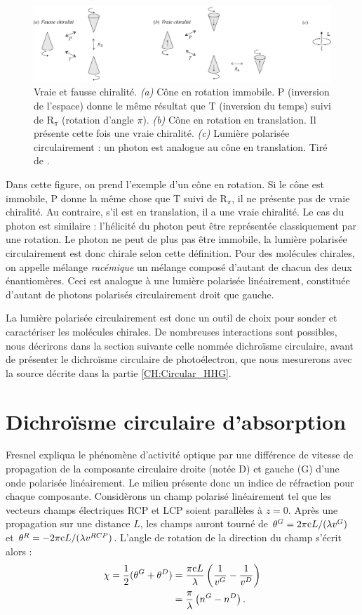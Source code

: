 \begin{figure}[!ht]
\centering
\includegraphics[width=.9\columnwidth]{Figures/Chirality/truefalsechir.pdf}%
\caption{Vraie et fausse chiralité. \textit{(a)} Cône en rotation immobile. P (inversion de l'espace) donne le même résultat que T (inversion du temps) suivi de $\text{R}_{\pi}$ (rotation d'angle $\pi$). \textit{(b)} Cône en rotation en translation. Il présente cette fois une vraie chiralité. \textit{(c)} Lumière polarisée circulairement : un photon est analogue au cône en translation. Tiré de .}
\label{fig:truefalsechir}
\end{figure}

Dans cette figure, on prend l'exemple d'un cône en rotation. Si le cône est immobile, P donne la même chose que T suivi de $\text{R}_{\pi}$, il ne présente pas de vraie chiralité. Au contraire, s'il est en translation, il a une vraie chiralité. Le cas du photon est similaire : l'hélicité du photon peut être représentée classiquement par une rotation. Le photon ne peut de plus pas être immobile, la lumière polarisée circulairement est donc chirale selon cette définition. Pour des molécules chirales, on appelle mélange \textit{racémique} un mélange composé d'autant de chacun des deux énantiomères. Ceci est analogue à une lumière polarisée linéairement, constituée d'autant de photons polarisés circulairement droit que gauche. 

La lumière polarisée circulairement est donc un outil de choix pour sonder et caractériser les molécules chirales. De nombreuses interactions sont possibles, nous décrirons dans la section suivante celle nommée dichroïsme circulaire, avant de présenter le dichroïsme circulaire de photoélectron, que nous mesurerons avec la source décrite dans la partie \ref{CH:Circular_HHG}.

\section{Dichroïsme circulaire d'absorption}
Fresnel expliqua le phénomène d'activité optique par une différence de vitesse de propagation de la composante circulaire droite (notée D) et gauche (G) d'une onde polarisée linéairement. Le milieu présente donc un indice de réfraction pour chaque composante. Considèrons un champ polarisé linéairement tel que les vecteurs champs électriques RCP et LCP soient parallèles à $z = 0$. Après une propagation sur une distance $L$, les champs auront tourné de $\theta^{G}=2\pi\mathrm{c} L/(\lambda v^{G})$ et $\theta^{R}=-2\pi\mathrm{c} L/(\lambda v^{RCP})$. L'angle de rotation de la direction du champ s'écrit alors :
\begin{align*}
\chi = \frac{1}{2}(\theta^{G}+\theta^{D}) &= \frac{\pi\mathrm{c} L}{\lambda}\left(\frac{1}{v^{G}}-\frac{1}{v^{D}}\right)\\
&= \frac{\pi}{\lambda}\left(n^{G}-n^{D}\right).
\end{align*}

